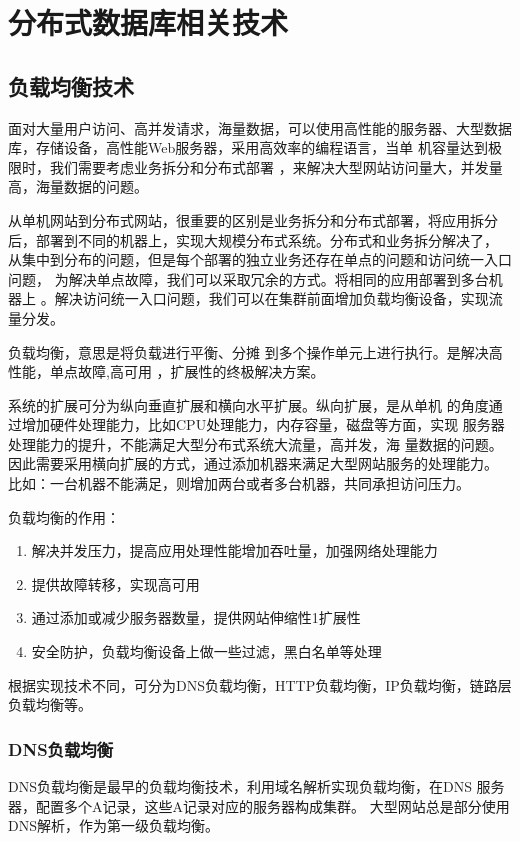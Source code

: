 \section{分布式数据库相关技术}
\subsection{负载均衡技术}
面对大量用户访问、高并发请求，海量数据，可以使用高性能的服务器、大型数据
库，存储设备，高性能Web服务器，采用高效率的编程语言，当单
机容量达到极限时，我们需要考虑业务拆分和分布式部署
，来解决大型网站访问量大，并发量高，海量数据的问题。

从单机网站到分布式网站，很重要的区别是业务拆分和分布式部署，将应用拆分
后，部署到不同的机器上，实现大规模分布式系统。分布式和业务拆分解决了，
从集中到分布的问题，但是每个部署的独立业务还存在单点的问题和访问统一入口问题，
为解决单点故障，我们可以采取冗余的方式。将相同的应用部署到多台机器上
。解决访问统一入口问题，我们可以在集群前面增加负载均衡设备，实现流量分发。

负载均衡，意思是将负载进行平衡、分摊
到多个操作单元上进行执行。是解决高性能，单点故障,高可用
，扩展性的终极解决方案。

系统的扩展可分为纵向垂直扩展和横向水平扩展。纵向扩展，是从单机
的角度通过增加硬件处理能力，比如CPU处理能力，内存容量，磁盘等方面，实现
服务器处理能力的提升，不能满足大型分布式系统大流量，高并发，海
量数据的问题。因此需要采用横向扩展的方式，通过添加机器来满足大型网站服务的处理能力。
比如：一台机器不能满足，则增加两台或者多台机器，共同承担访问压力。

\noindent
负载均衡的作用：
\begin{enumerate}
	\item 解决并发压力，提高应用处理性能增加吞吐量，加强网络处理能力
	\item 提供故障转移，实现高可用
	\item 通过添加或减少服务器数量，提供网站伸缩性1扩展性
	\item 安全防护，负载均衡设备上做一些过滤，黑白名单等处理
\end{enumerate}

根据实现技术不同，可分为DNS负载均衡，HTTP负载均衡，IP负载均衡，链路层
负载均衡等。

\subsubsection{DNS负载均衡}
DNS负载均衡是最早的负载均衡技术，利用域名解析实现负载均衡，在DNS
服务器，配置多个A记录，这些A记录对应的服务器构成集群。
大型网站总是部分使用DNS解析，作为第一级负载均衡。


